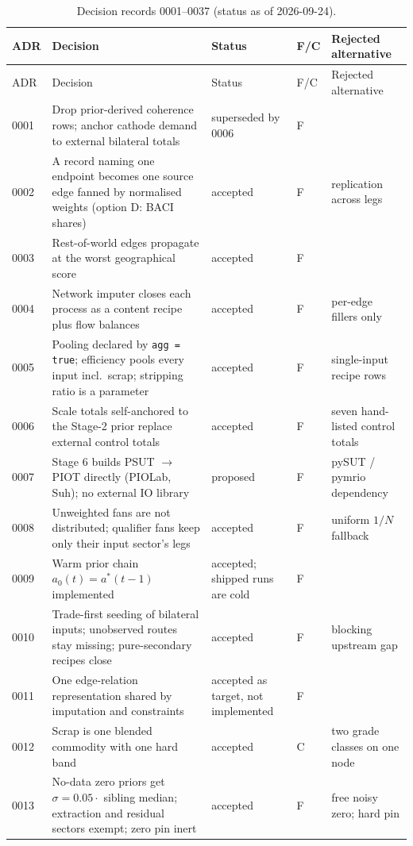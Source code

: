 \documentclass[11pt]{article}
\begin{document}
\begin{longtable}{@{}p{0.9cm}p{7.6cm}p{2.9cm}p{0.5cm}p{2.9cm}@{}}
\caption{Decision records 0001--0037 (status as of 2026-09-24).}
\label{tab:si-adr}\\
\toprule
ADR & Decision & Status & F/C & Rejected alternative \\
\midrule
\endfirsthead
\toprule
ADR & Decision & Status & F/C & Rejected alternative \\
\midrule
\endhead
0001 & Drop prior-derived coherence rows; anchor cathode demand to external bilateral totals & superseded by 0006 & F & \\
0002 & A record naming one endpoint becomes one source edge fanned by normalised weights (option D: BACI shares) & accepted & F & replication across legs \\
0003 & Rest-of-world edges propagate at the worst geographical score & accepted & F & \\
0004 & Network imputer closes each process as a content recipe plus flow balances & accepted & F & per-edge fillers only \\
0005 & Pooling declared by \texttt{agg = true}; efficiency pools every input incl.\ scrap; stripping ratio is a parameter & accepted & F & single-input recipe rows \\
0006 & Scale totals self-anchored to the Stage-2 prior replace external control totals & accepted & F & seven hand-listed control totals \\
0007 & Stage 6 builds PSUT $\to$ PIOT directly (PIOLab, Suh); no external IO library & proposed & F & pySUT / pymrio dependency \\
0008 & Unweighted fans are not distributed; qualifier fans keep only their input sector's legs & accepted & F & uniform $1/N$ fallback \\
0009 & Warm prior chain $a_0(t) = a^*(t-1)$ implemented & accepted; shipped runs are cold & F & \\
0010 & Trade-first seeding of bilateral inputs; unobserved routes stay missing; pure-secondary recipes close & accepted & F & blocking upstream gap \\
0011 & One edge-relation representation shared by imputation and constraints & accepted as target, not implemented & F & \\
0012 & Scrap is one blended commodity with one hard band & accepted & C & two grade classes on one node \\
0013 & No-data zero priors get $\sigma = 0.05 \cdot$ sibling median; extraction and residual sectors exempt; zero pin inert & accepted & F & free noisy zero; hard pin \\

\end{longtable}
\end{document}
